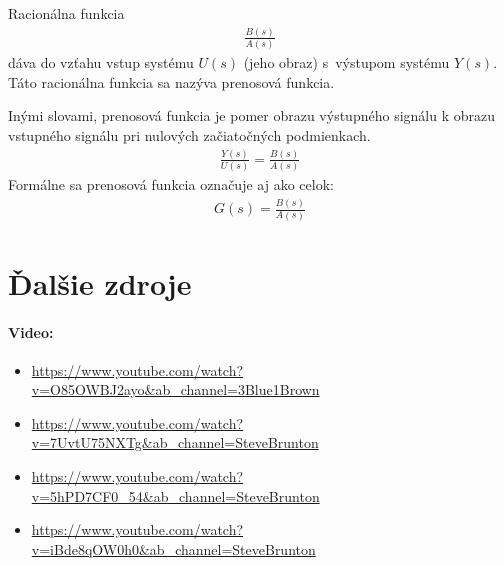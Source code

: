 \documentclass[a4paper, 10pt, ]{article}
\begin{document}
Racionálna funkcia
\begin{align}
    \frac{B(s)}{A(s)}
\end{align}
dáva do vzťahu vstup systému $U(s)$ (jeho obraz) s~výstupom systému $Y(s)$. Táto racionálna funkcia sa nazýva prenosová funkcia.

Inými slovami, prenosová funkcia je pomer obrazu výstupného signálu k obrazu vstupného signálu pri nulových začiatočných podmienkach.
\begin{align}
    \frac{Y(s)}{U(s)} = \frac{B(s)}{A(s)}
\end{align}
Formálne sa prenosová funkcia označuje aj ako celok:
\begin{align}
    G(s) = \frac{B(s)}{A(s)}
\end{align}







{}
% 




\section*{Ďalšie zdroje}

\paragraph{Video:}

\begin{itemize}[leftmargin=0pt, labelsep=3mm, itemsep=0pt]

	\item \url{https://www.youtube.com/watch?v=O85OWBJ2ayo&ab_channel=3Blue1Brown}

	\item \url{https://www.youtube.com/watch?v=7UvtU75NXTg&ab_channel=SteveBrunton}
	\item \url{https://www.youtube.com/watch?v=5hPD7CF0_54&ab_channel=SteveBrunton}
	\item \url{https://www.youtube.com/watch?v=iBde8qOW0h0&ab_channel=SteveBrunton}

\end{itemize}
\end{document}
